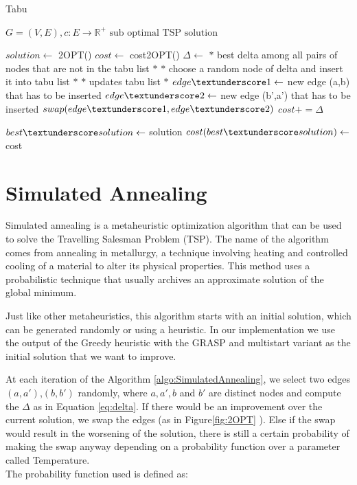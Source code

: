 \begin{algorithm}[!h]
    \caption{Tabu}\label{algo:tabu}
    \begin{algorithmic}[1]
    \Require $G = (V,E), c:E \to \mathbb{R}^+$
    \Ensure $\text{sub optimal TSP solution}$


    \State $solution \gets$ 2OPT()
    \State $cost \gets$ cost\textunderscore 2OPT()
    \State $\Delta\gets$ $*$ best delta among all pairs of nodes that are not in the tabu list $*$
    \State $*$ choose a random node of delta and insert it into tabu list $*$
    \State $*$ updates tabu list $*$
    \State $edge\textunderscore 1 \gets$ new edge (a,b) that has to be inserted
    \State $edge\textunderscore 2 \gets$ new edge (b',a') that has to be inserted
    \State $swap(edge\textunderscore 1,edge\textunderscore 2) $
    \State $cost += \Delta$

    \State $ best\textunderscore solution \gets$ solution
    \State $ cost(best\textunderscore solution) \gets$ cost
    \EndIf
    

    \EndWhile

    \end{algorithmic}
\end{algorithm}






\section{Simulated Annealing}

Simulated annealing is a metaheuristic optimization algorithm that can be used to solve the Travelling Salesman Problem (TSP).
The name of the algorithm comes from annealing in metallurgy, a technique involving heating and controlled cooling of a material to alter its physical properties. This method uses a probabilistic technique that usually archives an approximate solution of the global minimum.

Just like other metaheuristics, this algorithm starts with an initial solution, which can be generated randomly or using a heuristic. In our implementation we use the output of the Greedy heuristic with the GRASP and multistart variant as the initial solution that we want to improve.

At each iteration of the Algorithm \ref{algo:SimulatedAnnealing}, we select two edges $(a,a')$,$(b,b')$ randomly, where $a,a',b$ and $b'$ are distinct nodes and compute the $\Delta$ as in Equation \ref{eq:delta}. If there would be an improvement over the current solution, we swap the edges (as in Figure\ref{fig:2OPT} ). Else if the swap would result in the worsening of the solution, there is still a certain probability of making the swap anyway depending on a probability function over a parameter called Temperature. \\The probability function used is defined as:



